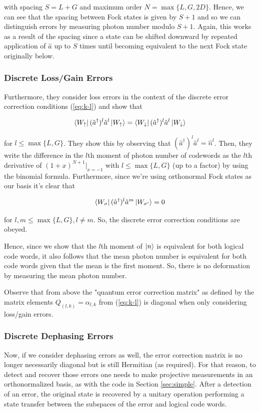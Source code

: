 \documentclass[12]{amsart}
\newcommand\0{\mathbf{0}}
\newcommand\<{\langle}
\renewcommand\>{\rangle}
\begin{document}
with spacing $S = L+G$ and maximum order $N = \max\{L, G, 2D\}$. Hence, we can see that the spacing between Fock states is given by $S+1$ and so we can distinguish errors by measuring photon number modulo $S+1$. Again, this works as a result of the spacing since a state can be shifted downward by repeated application of $\hat{a}$ up to $S$ times until becoming equivalent to the next Fock state originally below.

\subsubsection{Discrete Loss/Gain Errors}

 Furthermore, they consider loss errors in the context of the discrete error correction conditions (\ref{eq:k-l}) and show that

$$
\bra{W_\uparrow}(\hat{a}^\dag)^l\hat{a}^l \ket{W_{\uparrow}} = \bra{W_\downarrow}(\hat{a}^\dag)^l\hat{a}^l \ket{W_{\downarrow}}
$$ 

for $l \leq \max\{L, G\}$. They show this by observing that $(\hat{a}^\dag)^l\hat{a}^l = \hat{n}^l$. Then, they write the difference in the $l$th moment of photon number of codewords as the $l$th derivative of $(1+x)^{N+1}\vert_{x=-1}$ with $l \leq \max\{L, G\}$ (up to a factor) by using the binomial formula. Furthermore, since we're using orthonormal Fock states as our basis it's clear that

$$
\bra{W_\sigma}(\hat{a}^\dag)^l\hat{a}^m \ket{W_{\sigma'}} = 0
$$  

for $l, m \leq \max\{L, G\}, l \neq m$. So, the discrete error correction conditions are obeyed.

Hence, since we show that the $l$th moment of $\ket{n}$ is equivalent for both logical code words, it also follows that the mean photon number is equivalent for both code words given that the mean is the first moment. So, there is no deformation by measuring the mean photon number.

Observe that from above the "quantum error correction matrix" as defined by the matrix elements $Q_{(l, k)} = \alpha_{l, k}$ from (\ref{eq:k-l}) is diagonal when only considering loss/gain errors.

\subsubsection{Discrete Dephasing Errors}

Now, if we consider dephasing errors as well, the error correction matrix is no longer necessarily diagonal but is still Hermitian (as required). For that reason, to detect and recover those errors one needs to make projective measurements in an orthonormalized basis, as with the code in Section \ref{sec:simple}. After a detection of an error, the original state is recovered by a unitary operation performing a state transfer between the subspaces of the error and logical code words.
\end{document}
